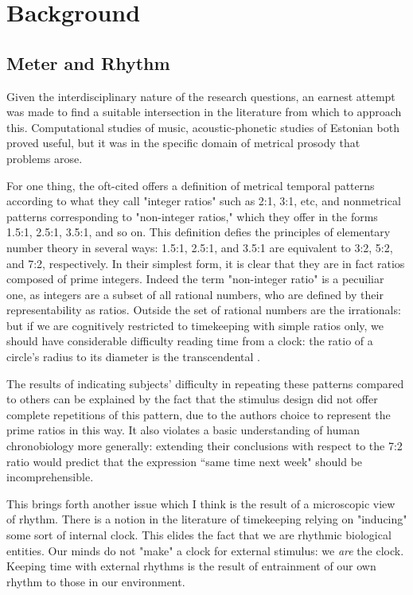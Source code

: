 \chapter{Background}

\section{Meter and Rhythm}

Given the interdisciplinary nature of the research questions, an earnest attempt was made to find a suitable intersection in the literature from which to approach this. Computational studies of music, acoustic-phonetic studies of Estonian both proved useful, but it was in the specific domain of metrical prosody that problems arose. 

For one thing, the oft-cited \citep{essensPovel1985} offers a definition of metrical  temporal patterns according to what they call "integer ratios" such as 2:1, 3:1, etc, and nonmetrical patterns corresponding to "non-integer ratios," which they offer in the forms 1.5:1, 2.5:1, 3.5:1, and so on. This definition defies the principles of elementary number theory in several ways: 1.5:1, 2.5:1, and 3.5:1 are equivalent to 3:2, 5:2, and 7:2, respectively. In their simplest form, it is clear that they are in fact ratios composed of prime integers. Indeed the term "non-integer ratio" is a pecuiliar one, as integers are a subset of all rational numbers, who are defined by their representability as ratios. Outside the set of rational numbers are the irrationals: but if we are cognitively restricted to timekeeping with simple ratios only, we should have considerable difficulty reading time from a clock: the ratio of a circle's radius to its diameter is the transcendental \pi.  

The results of \citep{essensPovel1985} indicating subjects' difficulty in repeating these patterns compared to others can be explained by the fact that the stimulus design did not offer complete repetitions of this pattern, due to the authors choice to represent the prime ratios in this way. It also violates a basic understanding of human chronobiology more generally: extending their conclusions with respect to the 7:2 ratio would predict that the expression ``same time next week" should be incomprehensible. 


This brings forth another issue which I think is the result of a microscopic view of rhythm. There is a notion in the literature of timekeeping relying on "inducing" some sort of internal clock. This elides the fact that we are rhythmic biological entities. Our minds do not "make" a clock for external stimulus: we {\it are} the clock. Keeping time with external rhythms is the result of entrainment of our own rhythm to those in our environment. \citep{chronobiology, musicCognition} 

